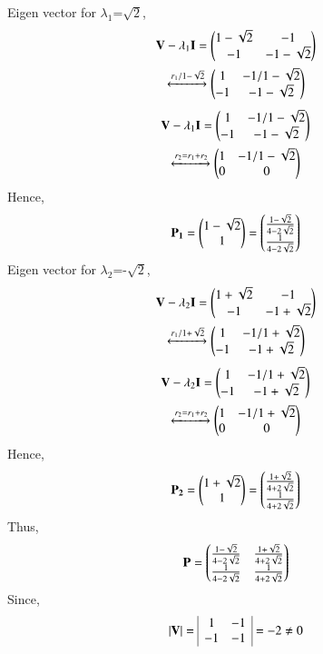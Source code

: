 \documentclass[journal,12pt,twocolumn]{IEEEtran}
\begin{document}
Eigen vector for $\lambda_1$=$\sqrt{2}$,
\begin{multline}
	\mathbf{V}-\lambda_1\mathbf{I} = \begin{pmatrix}1-\sqrt{2} & -1 \\ -1 & -1-\sqrt{2}\end{pmatrix}\\
	 \xleftrightarrow[]{r_1/1-\sqrt{2}} \begin{pmatrix}1 & -1/1-\sqrt{2} \\ -1 & -1-\sqrt{2}\end{pmatrix}
\end{multline}
\begin{multline}
	\mathbf{V}-\lambda_1\mathbf{I} = \begin{pmatrix}1 & -1/1-\sqrt{2} \\ -1 & -1-\sqrt{2}\end{pmatrix} \\
	\xleftrightarrow[]{r_2 = r_1 + r_2} \begin{pmatrix}1 & -1/1-\sqrt{2} \\ 0 & 0\end{pmatrix}
\end{multline}
Hence,
\begin{align}
\mathbf{P_1}= \begin{pmatrix}1-\sqrt{2} \\ 1\end{pmatrix} = \begin{pmatrix}\frac{1-\sqrt{2}}{4-2\sqrt{2}} \\ \frac{1}{4-2\sqrt{2}}\end{pmatrix}
\end{align}
Eigen vector for $\lambda_2$=-$\sqrt{2}$,
\begin{multline}
	\mathbf{V}-\lambda_2\mathbf{I} = \begin{pmatrix}1+\sqrt{2} & -1 \\ -1 & -1+\sqrt{2}\end{pmatrix}\\
	\xleftrightarrow[]{r_1/1+\sqrt{2}} \begin{pmatrix}1 & -1/1+\sqrt{2} \\ -1 & -1+\sqrt{2}\end{pmatrix}
\end{multline}
\begin{multline}
	\mathbf{V}-\lambda_2\mathbf{I} = \begin{pmatrix}1 & -1/1+\sqrt{2} \\ -1 & -1+\sqrt{2}\end{pmatrix} \\
	\xleftrightarrow[]{r_2 = r_1 + r_2} \begin{pmatrix}1 & -1/1+\sqrt{2} \\ 0 & 0\end{pmatrix}
\end{multline}
Hence,
\begin{align}
	\mathbf{P_2}= \begin{pmatrix}1+\sqrt{2} \\ 1\end{pmatrix} = \begin{pmatrix}\frac{1+\sqrt{2}}{4+2\sqrt{2}} \\ \frac{1}{4+2\sqrt{2}}\end{pmatrix}
\end{align}
Thus, 
\begin{align}
	\mathbf{P} = \begin{pmatrix}\frac{1-\sqrt{2}}{4-2\sqrt{2}} & \frac{1+\sqrt{2}}{4+2\sqrt{2}} \\ \frac{1}{4-2\sqrt{2}} & \frac{1}{4+2\sqrt{2}}\end{pmatrix}
\end{align}
Since,
\begin{align}
	\left\vert\mathbf{V}\right\vert =
	\begin{array}{|cc|}
		1 & -1\\ -1 & -1
	\end{array}=-2 \not=0 
\end{align}
\end{document}
